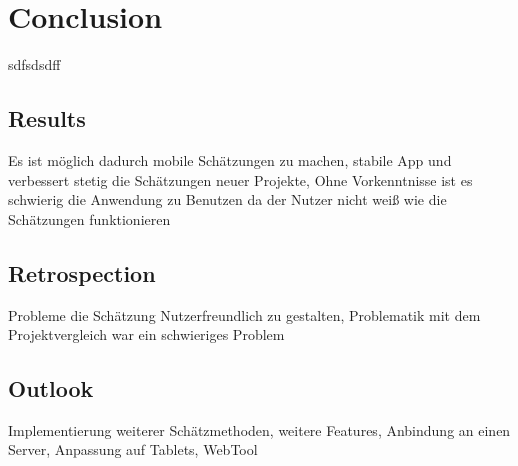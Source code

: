 \chapter{Conclusion}

sdfsdsdff


\section{Results}\label{result}

Es ist möglich dadurch mobile Schätzungen zu machen, stabile App und verbessert stetig die Schätzungen neuer Projekte, Ohne Vorkenntnisse ist es schwierig die Anwendung zu Benutzen da der  Nutzer nicht weiß wie die Schätzungen funktionieren

\section{Retrospection}

Probleme die Schätzung Nutzerfreundlich zu gestalten, Problematik mit dem Projektvergleich war ein schwieriges Problem

\section{Outlook}

Implementierung weiterer Schätzmethoden, weitere Features, Anbindung an einen Server, Anpassung auf Tablets, WebTool